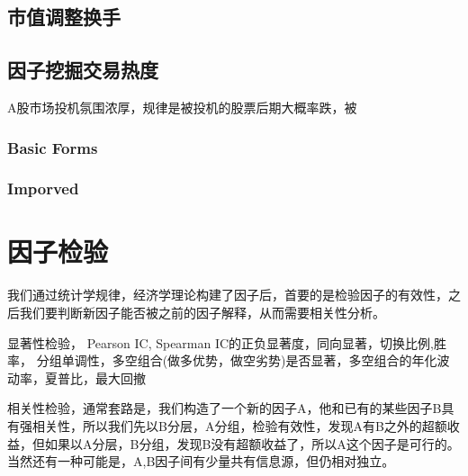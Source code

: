 \documentclass[12pt]{article}
\theoremstyle{definition}
\begin{document}
\subsection{市值调整换手}
\subsection{因子挖掘交易热度}
A股市场投机氛围浓厚，规律是被投机的股票后期大概率跌，被
\subsubsection{Basic Forms}
\subsubsection{Imporved}


\section{因子检验}
我们通过统计学规律，经济学理论构建了因子后，首要的是检验因子的有效性，之后我们要判断新因子能否被之前的因子解释，从而需要相关性分析。\par 
显著性检验，
Pearson IC, Spearman IC的正负显著度，同向显著，切换比例,胜率， 分组单调性，多空组合(做多优势，做空劣势)是否显著，多空组合的年化波动率，夏普比，最大回撤 \par
相关性检验，通常套路是，我们构造了一个新的因子A，他和已有的某些因子B具有强相关性，所以我们先以B分层，A分组，检验有效性，发现A有B之外的超额收益，但如果以A分层，B分组，发现B没有超额收益了，所以A这个因子是可行的。当然还有一种可能是，A,B因子间有少量共有信息源，但仍相对独立。
\end{document}
